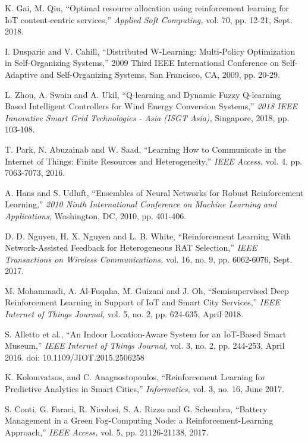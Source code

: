 \documentclass[journal]{IEEEtran}
\begin{document}
\begin{thebibliography}{1}
K. Gai, M. Qiu, ``Optimal resource allocation using reinforcement learning for IoT content-centric services,'' \emph{Applied Soft Computing,} vol. 70,
pp. 12-21, Sept. 2018.

I. Dusparic and V. Cahill, ``Distributed W-Learning: Multi-Policy Optimization in Self-Organizing Systems,'' 2009 Third IEEE International Conference on Self-Adaptive and Self-Organizing Systems, San Francisco, CA, 2009, pp. 20-29.

L. Zhou, A. Swain and A. Ukil, ``Q-learning and Dynamic Fuzzy Q-learning Based Intelligent Controllers for Wind Energy Conversion Systems,'' \emph{2018 IEEE Innovative Smart Grid Technologies - Asia (ISGT Asia),} Singapore, 2018, pp. 103-108.

T. Park, N. Abuzainab and W. Saad, ``Learning How to Communicate in the Internet of Things: Finite Resources and Heterogeneity,'' \emph{IEEE Access,} vol. 4, pp. 7063-7073, 2016.

A. Hans and S. Udluft, ``Ensembles of Neural Networks for Robust Reinforcement Learning,'' \emph{2010 Ninth International Conference on Machine Learning and Applications,} Washington, DC, 2010, pp. 401-406.

D. D. Nguyen, H. X. Nguyen and L. B. White, ``Reinforcement Learning With Network-Assisted Feedback for Heterogeneous RAT Selection,'' \emph{IEEE Transactions on Wireless Communications,} vol. 16, no. 9, pp. 6062-6076, Sept. 2017.

M. Mohammadi, A. Al-Fuqaha, M. Guizani and J. Oh, ``Semisupervised Deep Reinforcement Learning in Support of IoT and Smart City Services,'' \emph{IEEE Internet of Things Journal,} vol. 5, no. 2, pp. 624-635, April 2018.

S. Alletto et al., ``An Indoor Location-Aware System for an IoT-Based Smart Museum,'' \emph{IEEE Internet of Things Journal,} vol. 3, no. 2, pp. 244-253, April 2016.
doi: 10.1109/JIOT.2015.2506258

K. Kolomvatsos, and C. Anagnostopoulos, ``Reinforcement Learning for Predictive Analytics in
Smart Cities,'' \emph{Informatics,} vol. 3, no. 16, June 2017.

S. Conti, G. Faraci, R. Nicolosi, S. A. Rizzo and G. Schembra, ``Battery Management in a Green Fog-Computing Node: a Reinforcement-Learning Approach,'' \emph{IEEE Access,} vol. 5, pp. 21126-21138, 2017.


\end{thebibliography}
\end{document}
